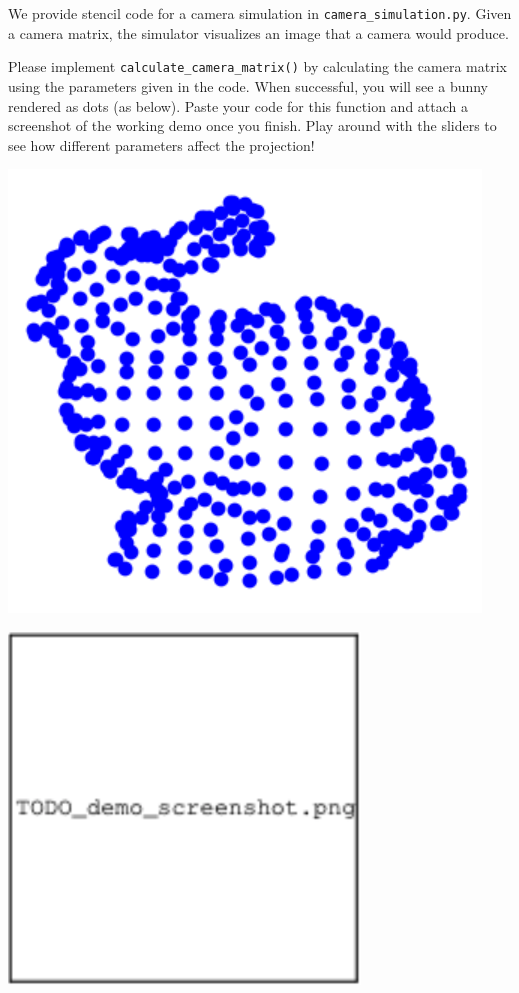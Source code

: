\documentclass{csci1430}
\begin{document}
\begin{answer}[height=12]
\end{answer}


\pagebreak

\begin{subquestion}[points=5,drawbox=false]
We provide stencil code for a camera simulation in \texttt{camera\_simulation.py}. Given a camera matrix, the simulator visualizes an image that a camera would produce. 
\end{subquestion}

\begin{orangebox}
Please implement \texttt{calculate\_camera\_matrix()} by calculating the camera matrix using the parameters given in the code. When successful, you will see a bunny rendered as dots (as below). Paste your code for this function and attach a screenshot of the working demo once you finish. Play around with the sliders to see how different parameters affect the projection!
\end{orangebox}

\includegraphics[width=0.5\linewidth]{images/bunny.png}

\begin{answer}
\includegraphics[width=0.7\textwidth,keepaspectratio]{images/TODO_demo_screenshot.png}
\end{answer}
\end{document}
